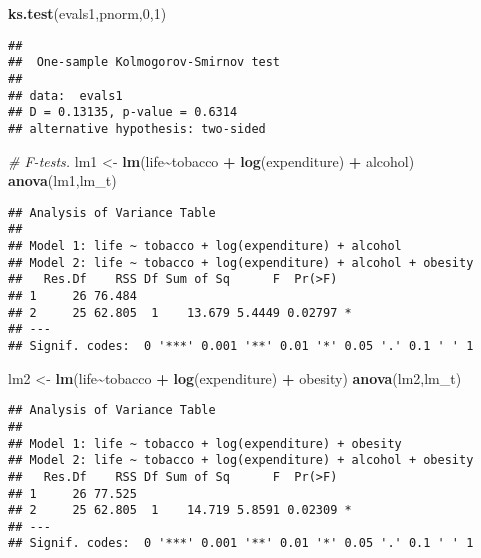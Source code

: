 \documentclass[
]{article}
\newenvironment{Shaded}{\begin{snugshade}}{\end{snugshade}}
\newcommand{\CommentTok}[1]{\textcolor[rgb]{0.56,0.35,0.01}{\textit{#1}}}
\newcommand{\DecValTok}[1]{\textcolor[rgb]{0.00,0.00,0.81}{#1}}
\newcommand{\FunctionTok}[1]{\textcolor[rgb]{0.13,0.29,0.53}{\textbf{#1}}}
\newcommand{\NormalTok}[1]{#1}
\newcommand{\OtherTok}[1]{\textcolor[rgb]{0.56,0.35,0.01}{#1}}
\newcommand{\SpecialCharTok}[1]{\textcolor[rgb]{0.81,0.36,0.00}{\textbf{#1}}}
\begin{document}
\begin{Shaded}
\begin{Highlighting}[]
\FunctionTok{ks.test}\NormalTok{(evals1,pnorm,}\DecValTok{0}\NormalTok{,}\DecValTok{1}\NormalTok{)}
\end{Highlighting}
\end{Shaded}

\begin{verbatim}
## 
##  One-sample Kolmogorov-Smirnov test
## 
## data:  evals1
## D = 0.13135, p-value = 0.6314
## alternative hypothesis: two-sided
\end{verbatim}

\begin{Shaded}
\begin{Highlighting}[]
\CommentTok{\# F{-}tests.}
\NormalTok{lm1 }\OtherTok{\textless{}{-}} \FunctionTok{lm}\NormalTok{(life}\SpecialCharTok{\textasciitilde{}}\NormalTok{tobacco }\SpecialCharTok{+} \FunctionTok{log}\NormalTok{(expenditure) }\SpecialCharTok{+}\NormalTok{ alcohol)}
\FunctionTok{anova}\NormalTok{(lm1,lm\_t)}
\end{Highlighting}
\end{Shaded}

\begin{verbatim}
## Analysis of Variance Table
## 
## Model 1: life ~ tobacco + log(expenditure) + alcohol
## Model 2: life ~ tobacco + log(expenditure) + alcohol + obesity
##   Res.Df    RSS Df Sum of Sq      F  Pr(>F)  
## 1     26 76.484                              
## 2     25 62.805  1    13.679 5.4449 0.02797 *
## ---
## Signif. codes:  0 '***' 0.001 '**' 0.01 '*' 0.05 '.' 0.1 ' ' 1
\end{verbatim}

\begin{Shaded}
\begin{Highlighting}[]
\NormalTok{lm2 }\OtherTok{\textless{}{-}} \FunctionTok{lm}\NormalTok{(life}\SpecialCharTok{\textasciitilde{}}\NormalTok{tobacco }\SpecialCharTok{+} \FunctionTok{log}\NormalTok{(expenditure) }\SpecialCharTok{+}\NormalTok{ obesity)}
\FunctionTok{anova}\NormalTok{(lm2,lm\_t)}
\end{Highlighting}
\end{Shaded}

\begin{verbatim}
## Analysis of Variance Table
## 
## Model 1: life ~ tobacco + log(expenditure) + obesity
## Model 2: life ~ tobacco + log(expenditure) + alcohol + obesity
##   Res.Df    RSS Df Sum of Sq      F  Pr(>F)  
## 1     26 77.525                              
## 2     25 62.805  1    14.719 5.8591 0.02309 *
## ---
## Signif. codes:  0 '***' 0.001 '**' 0.01 '*' 0.05 '.' 0.1 ' ' 1
\end{verbatim}
\end{document}

